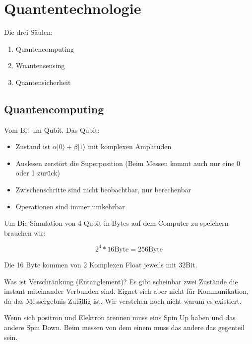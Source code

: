 \documentclass[a4paper]{article}
\title{\docTitle}
\author{Moritz}
\date{\today}
\begin{document}
\maketitle
\tableofcontents


\section{Quantentechnologie}

Die drei Säulen:

\begin{enumerate}
    \item Quantencomputing
    \item Wuantensensing
    \item Quantensicherheit
\end{enumerate}

\subsection{Quantencomputing}

Vom Bit um Qubit. Das Qubit:

\begin{itemize}
    \item Zustand ist $\alpha|0\rangle + \beta|1\rangle$ mit komplexen Amplituden
    \item Auslesen zerstört die Superposition (Beim Messen kommt auch nur eine 0 oder 1 zurück)
    \item Zwischenschritte sind nicht beobachtbar, nur berechenbar
    \item Operationen sind immer umkehrbar
\end{itemize}

Um Die Simulation von 4 Qubit in Bytes auf dem Computer zu speichern brauchen wir:

$$2^4* 16 \text{Byte} = 256 \text{Byte}$$

Die 16 Byte kommen von 2 Komplexen Float jeweils mit 32Bit.

Was ist Verschränkung (Entanglement)? Es gibt scheinbar zwei Zustände die instant miteinander Verbunden sind. Eignet sich aber nicht für Kommunikation, da das Messergebnis Zufällig ist. Wir verstehen noch nicht warum es existiert. 

Wenn sich positron und Elektron trennen muss eins Spin Up haben und das andere Spin Down. Beim messen von dem einem muss das andere das gegenteil sein.
\end{document}
